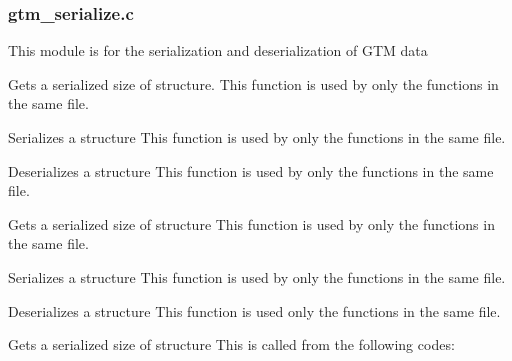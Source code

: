 
\subsubsection{gtm\_serialize.c}

  This module is for the serialization and deserialization of GTM data
  
  
	Gets a serialized size of  structure.
	This function is used by only the functions in the same file.
  
  
	Serializes a  structure
	This function is used by only the functions in the same file.
  
  
	Deserializes a  structure
	This function is used by only the functions in the same file.
  
  
	Gets a serialized size of  structure
	This function is used by only the functions in the same file.
  
  
	Serializes a  structure
	This function is used by only the functions in the same file.
  
  
	Deserializes a  structure
	This function is used only the functions in the same file.
  
  
	Gets a serialized size of  structure
	This is called from the following codes:
  
	\FuncRefHdr
	  \\
	  \\ \hline
	\FuncRefTrailor
  
